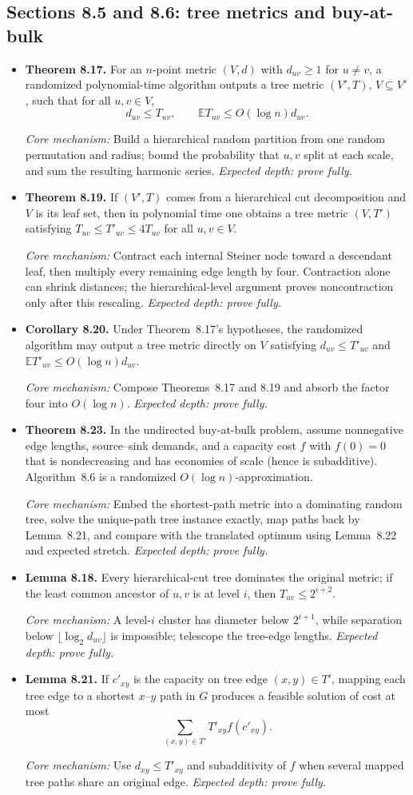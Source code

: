 \documentclass[11pt,a4paper]{article}
\newcommand{\E}{\mathbb E}
\newcommand{\1}{\mathbf 1}
\newcommand{\catalogue}[4]{%
  \item \textbf{#1.} #2\par
  {\footnotesize\emph{Core mechanism:} #3
  \emph{Expected depth: #4.}}}
\begin{document}
\subsection*{Sections 8.5 and 8.6: tree metrics and buy-at-bulk}
\begin{itemize}
\catalogue{Theorem 8.17}{For an $n$-point metric $(V,d)$ with
$d_{uv}\geq1$ for $u\neq v$, a randomized polynomial-time algorithm outputs a
tree metric $(V',T)$, $V\subseteq V'$, such that for all $u,v\in V$,
\[
d_{uv}\leq T_{uv},
\qquad \E T_{uv}\leq O(\log n)d_{uv}.
\]}
{Build a hierarchical random partition from one random permutation and
radius; bound the probability that $u,v$ split at each scale, and sum the
resulting harmonic series.}{prove fully}

\catalogue{Theorem 8.19}{If $(V',T)$ comes from a hierarchical cut
decomposition and $V$ is its leaf set, then in polynomial time one obtains a
tree metric $(V,T')$ satisfying
$T_{uv}\leq T'_{uv}\leq4T_{uv}$ for all $u,v\in V$.}{Contract each internal Steiner node toward a descendant leaf, then multiply every remaining edge length by four. Contraction alone can shrink distances; the hierarchical-level argument proves noncontraction only after this rescaling.}{prove fully}

\catalogue{Corollary 8.20}{Under Theorem~8.17's hypotheses, the randomized
algorithm may output a tree metric directly on $V$ satisfying
$d_{uv}\leq T'_{uv}$ and
$\E T'_{uv}\leq O(\log n)d_{uv}$.}{Compose Theorems~8.17 and 8.19 and absorb
the factor four into $O(\log n)$.}{prove fully}

\catalogue{Theorem 8.23}{In the undirected buy-at-bulk problem, assume
nonnegative edge lengths, source--sink demands, and a capacity cost $f$ with
$f(0)=0$ that is nondecreasing and has economies of scale (hence is
subadditive). Algorithm~8.6 is a randomized $O(\log n)$-approximation.}
{Embed the shortest-path metric into a dominating random tree, solve the
unique-path tree instance exactly, map paths back by Lemma~8.21, and compare
with the translated optimum using Lemma~8.22 and expected stretch.}{prove fully}

\catalogue{Lemma 8.18}{Every hierarchical-cut tree dominates the original
metric; if the least common ancestor of $u,v$ is at level $i$, then
$T_{uv}\leq2^{i+2}$.}{A level-$i$ cluster has diameter below $2^{i+1}$, while
separation below $\lfloor\log_2d_{uv}\rfloor$ is impossible; telescope the
tree-edge lengths.}{prove fully}

\catalogue{Lemma 8.21}{If $c'_{xy}$ is the capacity on tree edge
$(x,y)\in T'$, mapping each tree edge to a shortest $x$--$y$ path in $G$
produces a feasible solution of cost at most
\[
\sum_{(x,y)\in T'}T'_{xy}f(c'_{xy}).
\]}{Use $d_{xy}\leq T'_{xy}$ and subadditivity of $f$ when several mapped
tree paths share an original edge.}{prove fully}


\end{itemize}
\end{document}
